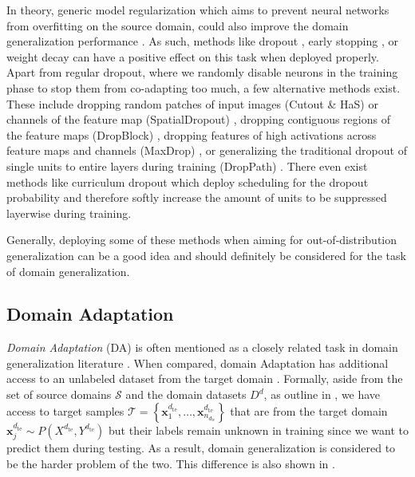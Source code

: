 In theory, generic model regularization which aims to prevent neural networks from overfitting on the source domain, could also improve the domain generalization performance \citep{huang2020selfchallenging}. As such, methods like dropout \citep{SrivastavaHKSS14}, early stopping \citep{CaruanaLG00}, or weight decay \citep{NowlanH92} can have a positive effect on this task when deployed properly. Apart from regular dropout, where we randomly disable neurons in the training phase to stop them from co-adapting too much, a few alternative methods exist. These include dropping random  patches of input images (Cutout \& HaS) \citep{devries2017improved, SinghL17} or channels of the feature map (SpatialDropout) \citep{TompsonGJLB15}, dropping contiguous regions of the feature maps (DropBlock) \citep{GhiasiLL18}, dropping features of high activations across feature maps and channels (MaxDrop) \citep{ParkK16}, or generalizing the traditional dropout of single units to entire layers during training (DropPath) \citep{LarssonMS17}. There even exist methods like curriculum dropout \citep{MorerioCVVM17} which deploy scheduling for the dropout probability and therefore softly increase the amount of units to be suppressed layerwise during training. 

Generally, deploying some of these methods when aiming for out-of-distribution generalization can be a good idea and should definitely be considered for the task of domain generalization.


\subsection{Domain Adaptation}

\emph{Domain Adaptation} (DA) is often mentioned as a closely related task in domain generalization literature \citep{MotiianPAD17, VolpiM19, QiaoZP20}. When compared, domain Adaptation has additional access to an unlabeled dataset from the target domain \citep{mancini2020, Csurka17}. Formally, aside from the set of source domains $\mathcal{S}$ and the domain datasets $D^d$, as outline in , we have access to target samples $\mathcal{T} = \left\{\mathbf{x}_{1}^{d_\mathrm{te}},\dots,\mathbf{x}_{n_{d_{\mathrm{te}}}}^{d_\mathrm{te}}\right\}$ that are from the target domain $\mathbf{x}_j^{d_{ \mathrm{te}}} \sim P(X^{d_{ \mathrm{te}}},Y^{d_{ \mathrm{te}}})$ but their labels remain unknown in training since we want to predict them during testing. As a result, domain generalization is considered to be the harder problem of the two. This difference is also shown in .

